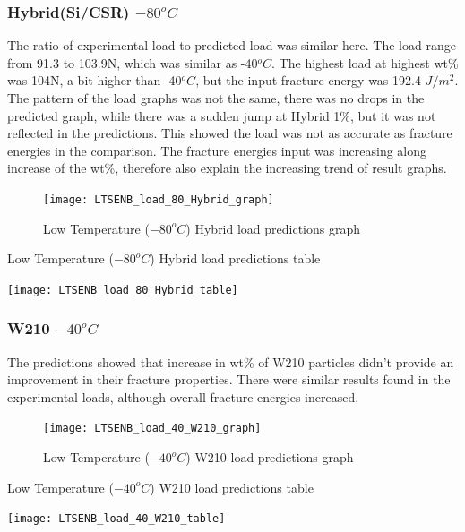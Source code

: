 \documentclass[numbers=noendperiod,chapterprefix=on]{icldt} %
\begin{document}
{\subsubsection{Hybrid(Si/CSR) $ -80 ^{o}C$}

The ratio of experimental load to predicted load was similar here. The load range from 91.3 to 103.9N, which was similar as -40$^oC$. The highest load at highest wt\% was 104N, a bit higher than -40$^{o}C$, but the input fracture energy was 192.4 $ J/m^{2} $. 
The pattern of the load graphs was not the same, there was no drops in the predicted graph, while there was a sudden jump at Hybrid 1\%, but it was not reflected in the predictions. This showed the load was not as accurate as fracture energies in the comparison. 
The fracture energies input was increasing along increase of the wt\%, therefore also explain the increasing trend of result graphs.

\begin{figure}[!hp]
  \centering
  \texttt{[image: LTSENB\_load\_80\_Hybrid\_graph]}\label{LTSENB_load_80_Hybrid_graph}
  \caption{Low Temperature ($ -80 ^{o}C$) Hybrid load predictions graph}
  \end{figure}

\begin{table}
    \centering
    \caption{Low Temperature ($ -80 ^{o}C$) Hybrid load predictions table}\label{LTSENB_load_80_Hybrid_table}
    \texttt{[image: LTSENB\_load\_80\_Hybrid\_table]}
    \end{table}
     

\subsubsection{W210 $ -40 ^{o}C$}
The predictions showed that increase in wt\% of W210 particles didn't provide an improvement in their fracture properties. There were similar results found in the experimental loads, although overall fracture energies increased.

\begin{figure}[!hp]
  \centering
  \texttt{[image: LTSENB\_load\_40\_W210\_graph]}\label{LTSENB_load_40_W210_graph}
  \caption{Low Temperature ($ -40 ^{o}C$) W210 load predictions graph}
  \end{figure}
 \FloatBarrier
 
 \begin{table}
    \centering
    \caption{Low Temperature ($ -40 ^{o}C$) W210 load predictions table}\label{LTSENB_load_40_W210_table}
    \texttt{[image: LTSENB\_load\_40\_W210\_table]}
    \end{table}
    \FloatBarrier

}
\end{document}
